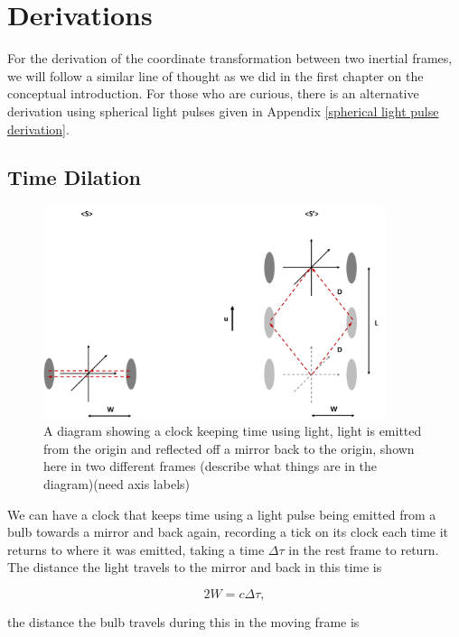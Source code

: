\section{Derivations}%
For the derivation of the coordinate transformation between two inertial frames, we will follow a similar line of thought as we did in the first chapter on the conceptual introduction. For those who are curious, there is an alternative derivation using spherical light pulses given in Appendix \ref{spherical light pulse derivation}.

\subsection{Time Dilation}

\begin{figure}[ht]
	\centering
	\includegraphics[width=10cm]{images/pdf/Light_clock.pdf}
	\caption{A diagram showing a clock keeping time using light, light is emitted from the origin and reflected off a mirror back to the origin, shown here in two different frames (describe what things are in the diagram)(need axis labels)}
	\label{fig: light clock}
\end{figure}

We can have a clock that keeps time using a light pulse being emitted from a bulb towards a mirror and back again, recording a tick on its clock each time it returns to where it was emitted, taking a time $\Delta \tau$ in the rest frame to return. The distance the light travels to the mirror and back in this time is

\begin{equation}
	2W=c\Delta \tau,
\end{equation}

the distance the bulb travels during this in the moving frame is


